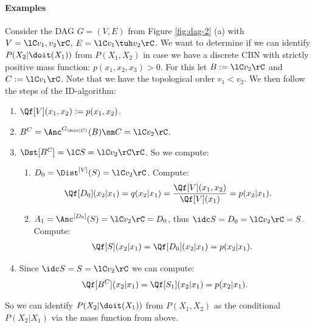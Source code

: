\paragraph{Examples}


\begin{Eg}
    Consider the DAG $G=(V,E)$ from Figure \ref{fig:dag-2} (a) with $V=\lC v_1,v_2 \rC$, 
    $E=\lC v_1 \tuh v_2 \rC$.
     We want to determine if we can identify $P(X_2|\doit(X_1))$ from $P(X_1,X_2)$ in case we have a discrete CBN with strictly positive mass function: $p(x_1,x_2,x_3) >0$.  
     For this let $B:=\lC v_2 \rC$ and $C:=\lC v_1 \rC$. Note that we have the topological order $v_1 < v_2$.
    We then follow the steps of the ID-algorithm:
    \begin{enumerate}
        \item $\Qf[V](x_1,x_2) := p(x_1,x_2)$.
        \item $B^C = \Anc^{G_{\doit(C)}}(B) \sm C = \lC v_2\rC$.
        \item $\Dst[B^C] =\lC S=\lC v_2 \rC \rC$. So we compute:
            \begin{enumerate}
                \item $D_{0} = \Dist^{[V]}(S) = \lC v_2 \rC$. Compute:
                    \begin{align*}
                        \Qf[D_{0}](x_2|x_1) &= q(x_2|x_1) = \frac{\Qf[V](x_1,x_2)}{\Qf[V](x_1)} = p(x_2|x_1).
                    \end{align*}
                \item $A_{1} = \Anc^{[D_{0}]}(S) = \lC v_2\rC=D_{0}$, thus $\idc S = D_{0}=\lC v_2 \rC =S$. Compute:
                    \begin{align*}
                        \Qf[S](x_2|x_1) = \Qf[D_{0}](x_2|x_1) = p(x_2|x_1). 
                    \end{align*}
            \end{enumerate}
        \item Since $\idc S = S = \lC v_2 \rC$ we can compute: 
            \begin{align*}
                   \Qf[B^C](x_2|x_1)  = \Qf[S_1](x_2|x_1) = p(x_2|x_1) . 
               \end{align*}
    \end{enumerate}
    So we can identify $P(X_2|\doit(X_1))$ from $P(X_1,X_2)$ as the conditional $P(X_2|X_1)$ via the mass function from above.
\end{Eg}

